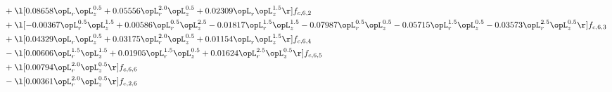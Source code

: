 \begin{alignat}{2}
& + \l[  0.08658 \opL_r \opL_z^{0.5} +  0.05556 \opL_r^{2.0} \opL_z^{0.5} +  0.02309 \opL_r \opL_z^{1.5}  \r] f_{c,6,2} \nonumber \\ 
& + \l[  -0.00367 \opL_r^{0.5} \opL_z^{1.5} +  0.00586 \opL_r^{0.5} \opL_z^{2.5}   -0.01817 \opL_r^{1.5} \opL_z^{1.5}   -0.07987 \opL_r^{0.5} \opL_z^{0.5}   -0.05715 \opL_r^{1.5} \opL_z^{0.5}   -0.03573 \opL_r^{2.5} \opL_z^{0.5}  \r] f_{c,6,3} \nonumber \\ 
& + \l[  0.04329 \opL_r \opL_z^{0.5} +  0.03175 \opL_r^{2.0} \opL_z^{0.5} +  0.01154 \opL_r \opL_z^{1.5}  \r] f_{c,6,4} \nonumber \\ 
& - \l[  0.00606 \opL_r^{1.5} \opL_z^{1.5} +  0.01905 \opL_r^{1.5} \opL_z^{0.5} +  0.01624 \opL_r^{2.5} \opL_z^{0.5}  \r] f_{c,6,5} \nonumber \\ 
& + \l[  0.00794 \opL_r^{2.0} \opL_z^{0.5}  \r] f_{c,6,6} \nonumber \\ 
& - \l[  0.00361 \opL_r^{2.0} \opL_z^{0.5}  \r] f_{c,2,6} \nonumber \\ 
\end{alignat} 


